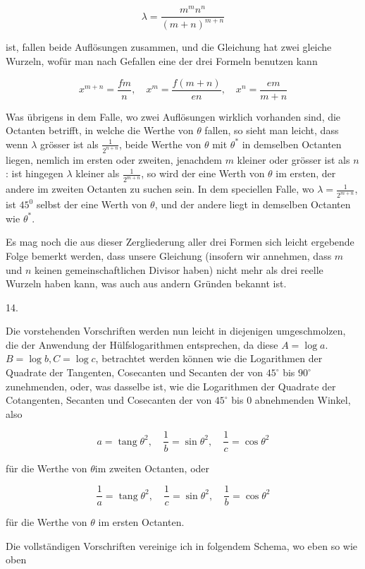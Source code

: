 \documentclass[10pt]{article}
\begin{document}
\[
\lambda=\frac{m^{m} n^{n}}{(m+n)^{m+n}}
\]

ist, fallen beide Auflösungen zusammen, und die Gleichung hat zwei gleiche Wurzeln, wofür man nach Gefallen eine der drei Formeln benutzen kann

\[
x^{m+n}=\frac{f m}{n}, \quad x^{m}=\frac{f(m+n)}{e n}, \quad x^{n}=\frac{e m}{m+n}
\]

Was übrigens in dem Falle, wo zwei Auflösungen wirklich vorhanden sind, die Octanten betrifft, in welche die Werthe von \(\theta\) fallen, so sieht man leicht, dass wenn \(\lambda\) grösser ist als \(\frac{1}{2^{n+n}}\), beide Werthe von \(\theta\) mit \(\theta^{*}\) in demselben Octanten liegen, nemlich im ersten oder zweiten, jenachdem \(m\) kleiner oder grösser ist als \(n\) : ist hingegen \(\lambda\) kleiner als \(\frac{1}{2^{m+n}}\), so wird der eine Werth von \(\theta\) im ersten, der andere im zweiten Octanten zu suchen sein. In dem speciellen Falle, wo \(\lambda=\frac{1}{2^{m+n}}\), ist \(45^{0}\) selbst der eine Werth von \(\theta\), und der andere liegt in demselben Octanten wie \(\theta^{*}\).

Es mag noch die aus dieser Zergliederung aller drei Formen sich leicht ergebende Folge bemerkt werden, dass unsere Gleichung (insofern wir annehmen, dass \(m\) und \(n\) keinen gemeinschaftlichen Divisor haben) nicht mehr als drei reelle Wurzeln haben kann, was auch aus andern Gründen bekannt ist.

14.

Die vorstehenden Vorschriften werden nun leicht in diejenigen umgeschmolzen, die der Anwendung der Hülfslogarithmen entsprechen, da diese \(A=\log a\). \(B=\log b, C=\log c\), betrachtet werden können wie die Logarithmen der Quadrate der Tangenten, Cosecanten und Secanten der von \(45^{\circ}\) bis \(90^{\circ}\) zunehmenden, oder, was dasselbe ist, wie die Logarithmen der Quadrate der Cotangenten, Secanten und Cosecanten der von \(45^{\circ}\) bis 0 abnehmenden Winkel, also

\[
a=\operatorname{tang} \theta^{2}, \quad \frac{1}{b}=\sin \theta^{2}, \quad \frac{1}{c}=\cos \theta^{2}
\]

für die Werthe von \(\theta \mathrm{im}\) zweiten Octanten, oder

\[
\frac{1}{a}=\operatorname{tang} \theta^{2}, \quad \frac{1}{c}=\sin \theta^{2}, \quad \frac{1}{b}=\cos \theta^{2}
\]

für die Werthe von \(\theta\) im ersten Octanten.

Die vollständigen Vorschriften vereinige ich in folgendem Schema, wo eben so wie oben
\end{document}

